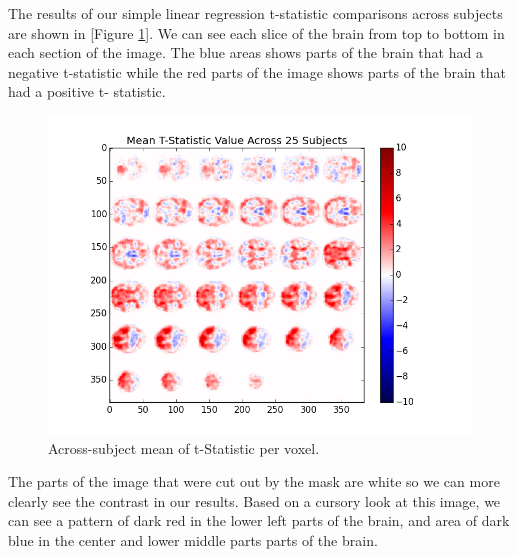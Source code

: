 \par \indent The results of our simple linear regression t-statistic
comparisons across subjects are shown in [Figure \ref{fig:mask}]. We can see
each slice of the brain from top to bottom in each section of the image. The
blue areas shows parts of the brain that had a negative t-statistic while the
red parts of the image shows parts of the brain that had a positive t-
statistic.

\begin{figure}[ht] \centering
\includegraphics[scale=0.5]{images/hypothesis_testing} \caption{Across-subject
mean of t-Statistic per voxel.} \label{fig:mask} \end{figure}

\par The parts of the image that were cut out by the mask are white so we can
more clearly see the contrast in our results. Based on a cursory look at this
image, we can see a pattern of dark red in the lower left parts of the brain,
and area of dark blue in the center and lower middle parts parts of the brain.


